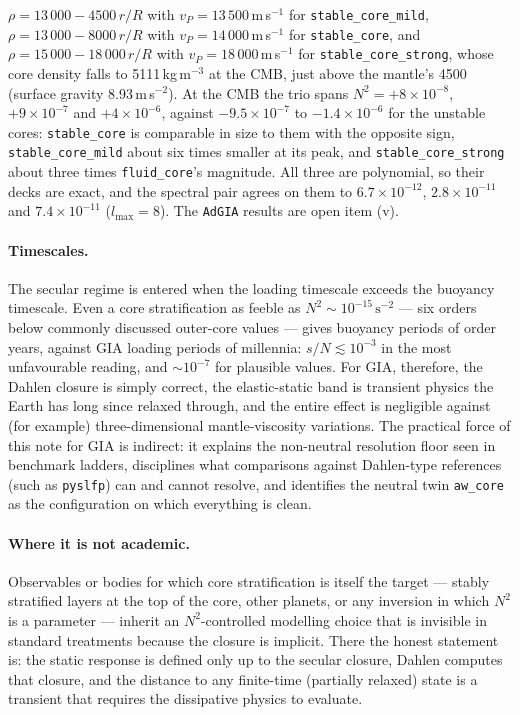 \documentclass[11pt]{article}
\newcommand{\code}[1]{\texttt{#1}}
\begin{document}
$\rho = 13\,000 - 4500\,r/R$ with $v_P = 13\,500$\,m\,s$^{-1}$ for
\code{stable\_core\_mild}, $\rho = 13\,000 - 8000\,r/R$ with
$v_P = 14\,000$\,m\,s$^{-1}$ for \code{stable\_core}, and
$\rho = 15\,000 - 18\,000\,r/R$ with $v_P = 18\,000$\,m\,s$^{-1}$ for
\code{stable\_core\_strong}, whose core density falls to 5111\,kg\,m$^{-3}$
at the CMB, just above the mantle's 4500 (surface gravity
8.93\,m\,s$^{-2}$). At the CMB the trio spans $N^2 = +8\times10^{-8}$,
$+9\times10^{-7}$ and $+4\times10^{-6}$, against $-9.5\times10^{-7}$ to
$-1.4\times10^{-6}$ for the unstable cores: \code{stable\_core} is
comparable in size to them with the opposite sign,
\code{stable\_core\_mild} about six times smaller at its peak, and
\code{stable\_core\_strong} about three times \code{fluid\_core}'s
magnitude. All three are polynomial, so their decks are exact, and the
spectral pair agrees on them to $6.7\times10^{-12}$,
$2.8\times10^{-11}$ and $7.4\times10^{-11}$ ($l_{\max} = 8$). The
\code{AdGIA} results are open item (v).

\paragraph{Timescales.} The secular regime is entered when the
loading timescale exceeds the buoyancy timescale. Even a core
stratification as feeble as $N^2 \sim 10^{-15}\,\mathrm{s}^{-2}$ ---
six orders below commonly discussed outer-core values --- gives
buoyancy periods of order years, against GIA loading periods of
millennia: $s/N \lesssim 10^{-3}$ in the most unfavourable
reading, and $\sim 10^{-7}$ for plausible values. For GIA, therefore,
the Dahlen closure is simply correct, the elastic-static band is
transient physics the Earth has long since relaxed through, and the
entire effect is negligible against (for example) three-dimensional
mantle-viscosity variations. The practical force of this note for GIA
is indirect: it explains the non-neutral resolution floor seen in
benchmark ladders, disciplines what comparisons against Dahlen-type
references (such as \code{pyslfp}) can and cannot resolve, and
identifies the neutral twin \code{aw\_core} as the configuration on
which everything is clean.

\paragraph{Where it is not academic.} Observables or bodies for which
core stratification is itself the target --- stably stratified layers
at the top of the core, other planets, or any inversion in which
$N^2$ is a parameter --- inherit an $N^2$-controlled modelling choice
that is invisible in standard treatments because the closure is
implicit. There the honest statement is: the static response is
defined only up to the secular closure, Dahlen computes that closure,
and the distance to any finite-time (partially relaxed) state is a
transient that requires the dissipative physics to evaluate.
\end{document}
